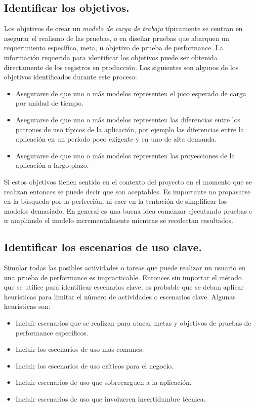 \subsection{Identificar los objetivos.}
Los objetivos de crear un \emph{modelo de carga de trabajo} típicamente se centran en asegurar el realismo de las pruebas, o en diseñar pruebas que abarquen un requerimiento
específico, meta, u objetivo de prueba de performance. La información requerida para identificar los objetivos puede ser obtenida directamente de los registros en producción. Los
siguientes son algunos de los objetivos identificados durante este proceso:
\begin{itemize}
	\item
	Asegurarse de que uno o más modelos representen el pico esperado de carga por unidad de tiempo.
	\item
	Asegurarse de que uno o más modelos representen las diferencias entre los patrones de uso típicos de la aplicación, por ejemplo las diferencias entre la aplicación en un período
	poco exigente y en uno de alta demanda.
	\item
	Asegurarse de que uno o más modelos representen las proyecciones de la aplicación a largo plazo.
\end{itemize}

Si estos objetivos tienen sentido en el contexto del proyecto en el momento que se realizan entonces se puede decir que son aceptables. Es importante no propasarse en la búsqueda
por la perfección, ni caer en la tentación de simplificar los modelos demasiado. En general es una buena idea comenzar ejecutando pruebas e ir ampliando el modelo
incrementalmente mientras se recolectan resultados.

\subsection{Identificar los escenarios de uso clave.}
Simular todas las posibles actividades o tareas que puede realizar un usuario en una prueba de performance es impracticable. Entonces sin importar el método que se utilice para
identificar escenarios clave, es probable que se deban aplicar heurísticas para limitar el número de actividades o escenarios clave. Algunas heurísticas son:
\begin{itemize}
	\item
	Incluír escenarios que se realizan para atacar metas y objetivos de pruebas de performance específicos.
	\item
	Incluir los escenarios de uso más comunes.
	\item
	Incluir los escenarios de uso críticos para el negocio.
	\item
	Incluir escenarios de uso que sobrecarguen a la aplicación.
	\item
	Incluir escenarios de uso que involucren incertidumbre técnica.
\end{itemize}

